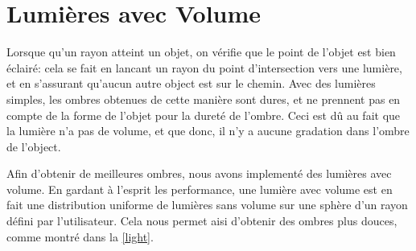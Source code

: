\documentclass{article}
\begin{document}
\section{Lumières avec Volume}

Lorsque qu'un rayon atteint un objet, on vérifie que le point de l'objet est
bien éclairé: cela se fait en lancant un rayon du point d'intersection vers une
lumière, et en s'assurant qu'aucun autre object est sur le chemin. Avec des
lumières simples, les ombres obtenues de cette manière sont dures, et ne
prennent pas en compte de la forme de l'objet pour la dureté de l'ombre.
Ceci est dû au fait que la lumière n'a pas de volume, et que donc, il n'y a
aucune gradation dans l'ombre de l'object.

Afin d'obtenir de meilleures ombres, nous avons implementé des lumières avec
volume. En gardant à l'esprit les performance, une lumière avec volume est en
fait une distribution uniforme de lumières sans volume sur une sphère d'un
rayon défini par l'utilisateur. Cela nous permet aisi d'obtenir des ombres plus
douces, comme montré dans la \cref{light}.
\end{document}
